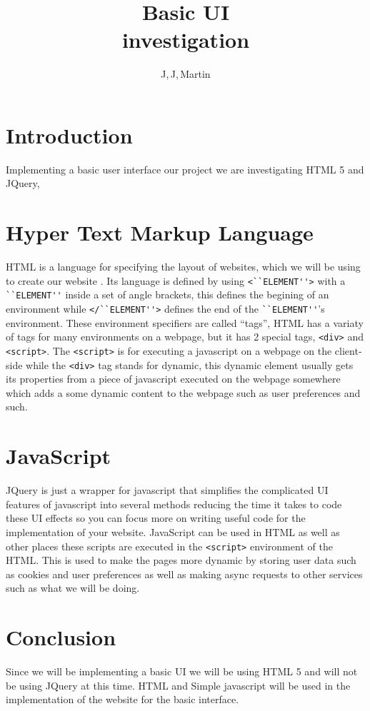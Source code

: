 \documentclass{article}
\author{J,\,J,\,Martin}
\title{Basic UI \\investigation}
\begin{document}
\maketitle

\section{Introduction}
Implementing a basic user interface our project we are investigating HTML 5 and JQuery,
\section{Hyper Text Markup Language}
HTML is a language for specifying the layout of websites, which we will be using to create our website . Its language is defined by using \verb+<``ELEMENT''>+ with a \verb+``ELEMENT''+ inside a set of angle brackets, this defines the begining of an environment while \verb+</``ELEMENT''>+ defines the end of the \verb+``ELEMENT''+'s environment. These environment specifiers are called ``tags'', HTML has a variaty of tags for many environments on a webpage, but it has 2 special tags, \verb+<div>+ and \verb+<script>+. The \verb+<script>+ is for executing a javascript on a webpage on the client-side while the \verb+<div>+ tag stands for dynamic, this dynamic element usually gets its properties from a piece of javascript executed on the webpage somewhere which adds a some dynamic content to the webpage such as user preferences and such.
\section{JavaScript}
JQuery is just a wrapper for javascript that simplifies the complicated UI features of javascript into several methods reducing the time it takes to code these UI effects so you can focus more on writing useful code for the implementation of your website. JavaScript can be used in HTML as well as other places these scripts are executed in the \verb+<script>+ environment of the HTML. This is used to make the pages more dynamic by storing user data such as cookies and user preferences as well as making async requests to other services such as what we will be doing.  

\section{Conclusion}
Since we will be implementing a basic UI we will be using HTML 5 and will not be using JQuery at this time. HTML and Simple javascript will be used in the implementation of the website for the basic interface.
\end{document}
